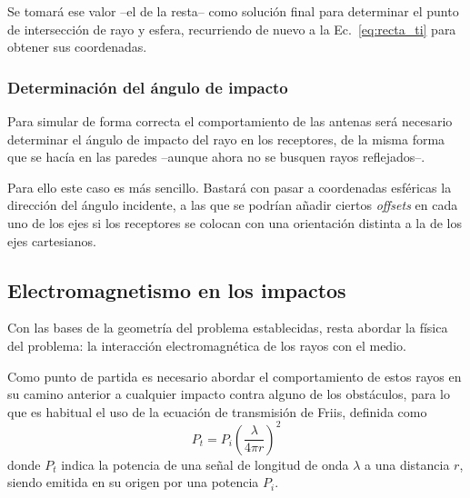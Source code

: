 Se tomará ese valor --el de la resta-- como solución final para determinar el punto de intersección de rayo y esfera, recurriendo de nuevo a la Ec.~\eqref{eq:recta_ti} para obtener sus coordenadas.

\subsubsection*{Determinación del ángulo de impacto}

Para simular de forma correcta el comportamiento de las antenas será necesario determinar el ángulo de impacto del rayo en los receptores, de la misma forma que se hacía en las paredes --aunque ahora no se busquen rayos reflejados--.

Para ello este caso es más sencillo.
Bastará con pasar a coordenadas esféricas la dirección del ángulo incidente, a las que se podrían añadir ciertos \textit{offsets} en cada uno de los ejes si los receptores se colocan con una orientación distinta a la de los ejes cartesianos.




\subsection{Electromagnetismo en los impactos}

Con las bases de la geometría del problema establecidas, resta abordar la física del problema: la interacción electromagnética de los rayos con el medio.

Como punto de partida es necesario abordar el comportamiento de estos rayos en su camino anterior a cualquier impacto contra alguno de los obstáculos, para lo que es habitual el uso de la ecuación de transmisión de Friis, definida como\cite{Antennas}
\begin{equation}
    \label{eq:Friis}
    P_t = P_i \left( \frac{\lambda}{4\pi r} \right)^2
\end{equation}
donde $P_t$ indica la potencia de una señal de longitud de onda $\lambda$ a una distancia $r$, siendo emitida en su origen por una potencia $P_i$.

